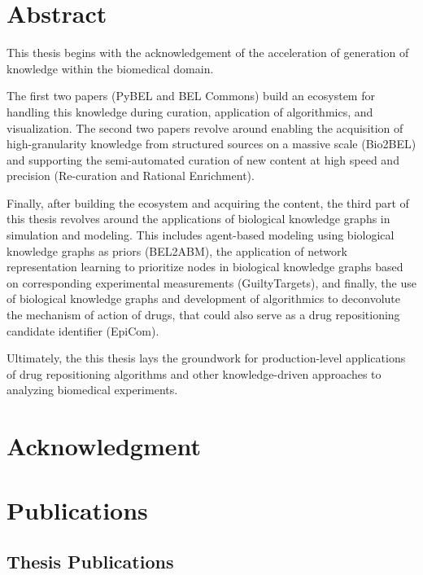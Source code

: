 \chapter*{Abstract}

This thesis begins with the acknowledgement of the acceleration of generation of knowledge within the biomedical domain.

The first two papers (PyBEL and BEL Commons) build an ecosystem for handling this knowledge during curation, application of algorithmics, and visualization.
The second two papers revolve around enabling the acquisition of high-granularity knowledge from structured sources on a massive scale (Bio2BEL) and supporting the semi-automated curation of new content at high speed and precision (Re-curation and Rational Enrichment).

Finally, after building the ecosystem and acquiring the content, the third part of this thesis revolves around the applications of biological knowledge graphs in simulation and modeling.
This includes agent-based modeling using biological knowledge graphs as priors (BEL2ABM), the application of network representation learning to prioritize nodes in biological knowledge graphs based on corresponding experimental measurements (GuiltyTargets), and finally, the use of biological knowledge graphs and development of algorithmics to deconvolute the mechanism of action of drugs, that could also serve as a drug repositioning candidate identifier (EpiCom).

Ultimately, the this thesis lays the groundwork for production-level applications of drug repositioning algorithms and other knowledge-driven approaches to analyzing biomedical experiments.

\setlength{\parskip}{1em} %
\renewcommand{\baselinestretch}{1.2} %

\chapter*{Acknowledgment}

\chapter*{Publications}

\section*{Thesis Publications}

